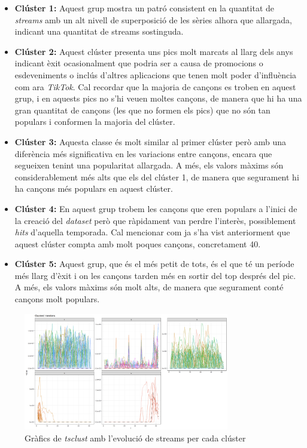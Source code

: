 \begin{itemize}
    \item \textbf{Clúster 1:} Aquest grup mostra un patró consistent en la quantitat de \textit{streams} amb un alt nivell de superposició de les sèries alhora que allargada, indicant una quantitat de streams sostinguda.
    
    \item \textbf{Clúster 2:} Aquest clúster presenta uns pics molt marcats al llarg dels anys indicant èxit ocasionalment que podria ser a causa de promocions o esdeveniments o inclús d'altres aplicacions que tenen molt poder d'influència com ara \textit{TikTok}. Cal recordar que la majoria de cançons es troben en aquest grup, i en aquests pics no s'hi veuen moltes cançons, de manera que hi ha una gran quantitat de cançons (les que no formen els pics) que no són tan populars i conformen la majoria del clúster.
    
    \item \textbf{Clúster 3:} Aquesta classe és molt similar al primer clúster però amb una diferència més significativa en les variacions entre cançons, encara que segueixen tenint una popularitat allargada. A més, els valors màxims són considerablement més alts que els del clúster 1, de manera que segurament hi ha cançons més populars en aquest clúster.
    
    \item \textbf{Clúster 4:} En aquest grup trobem les cançons que eren populars a l'inici de la creació del \textit{dataset} però que ràpidament van perdre l'interès, possiblement \textit{hits} d'aquella temporada. Cal mencionar com ja s'ha vist anteriorment que aquest clúster compta amb molt poques cançons, concretament 40.
    
    \item \textbf{Clúster 5:} Aquest grup, que és el més petit de tots, és el que té un període més llarg d'èxit i on les cançons tarden més en sortir del top després del pic. A més, els valors màxims són molt alts, de manera que segurament conté cançons molt populars.
\end{itemize}


\begin{figure}[H]
    \centering
    \includegraphics[width=0.8\textwidth]{Images/4_clustering/time_series/tsclust_sc.png}
    \caption{Gràfics de \textit{tsclust} amb l'evolució de streams per cada clúster}
    \label{fig:TS_tsclust_sc}
\end{figure}


